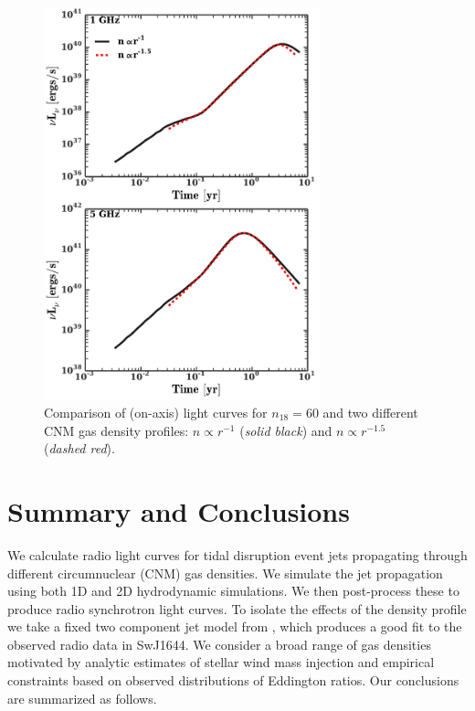 \documentclass[usenatbib,fleqn]{mnras}
\begin{document}
\begin{figure} 
  \includegraphics[width=8cm]{profs2.pdf}
  \caption{\label{fig:profs2} Comparison of (on-axis) light curves for
    $n_{18}=60$ and two different CNM gas density profiles: $n\propto
    r^{-1}$ ({\it solid black}) and $n\propto r^{-1.5}$ ({\it dashed
      red}).}
\end{figure}



\section{Summary and Conclusions}
\label{sec:conc}

We calculate radio light curves for tidal disruption event jets
propagating through different circumnuclear (CNM) gas densities. We
simulate the jet propagation using both 1D and 2D hydrodynamic
simulations. We then post-process these to produce radio synchrotron
light curves. To isolate the effects of the density profile we take a
fixed two component jet model from \citet{Mimica+2015}, which produces
a good fit to the observed radio data in SwJ1644. We
consider a broad range of gas densities motivated by analytic
estimates of stellar wind mass injection and empirical constraints
based on observed distributions of Eddington ratios. Our conclusions
are summarized as follows.
\end{document}
